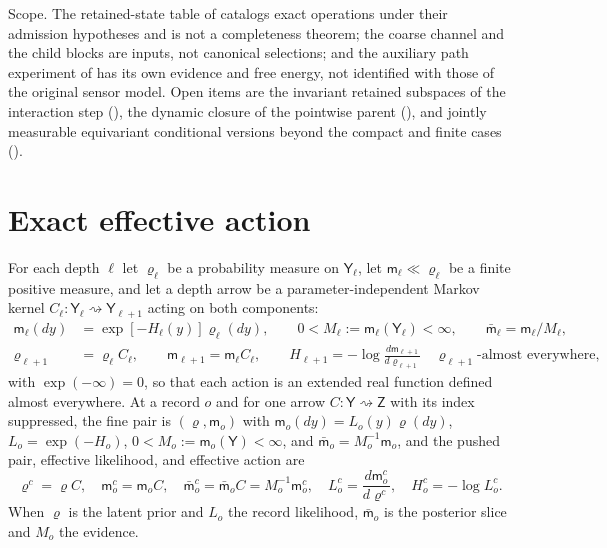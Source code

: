 Scope. The retained-state table of  catalogs exact
operations under their admission hypotheses and is not a completeness theorem;
the coarse channel and the child blocks are inputs, not canonical selections; and
the auxiliary path experiment of  has its own
evidence and free energy, not identified with those of the original sensor model.
 Open items are the invariant retained subspaces of the
interaction step (), the dynamic closure
of the pointwise parent (), and jointly
measurable equivariant conditional versions beyond the compact and finite cases
().

\section{Exact effective action}
\label{sec:rg-effective-action}
\label{sec:rg-measure-pair-arrows}

For each depth $\ell$ let $\varrho_\ell$ be a probability measure on
$\mathsf Y_\ell$, let $\mathsf m_\ell\ll\varrho_\ell$ be a finite positive measure,
and let a depth arrow be a parameter-independent Markov kernel
$C_\ell:\mathsf Y_\ell\rightsquigarrow\mathsf Y_{\ell+1}$ acting on both components:
\begin{align}
\mathsf m_\ell(dy)&=\exp[-H_\ell(y)]\varrho_\ell(dy),
\qquad
0<M_\ell:=\mathsf m_\ell(\mathsf Y_\ell)<\infty,
\qquad
\bar{\mathsf m}_\ell=\mathsf m_\ell/M_\ell,
\label{eq:rg-measure-pair-normalization}\\
\varrho_{\ell+1}&=\varrho_\ell C_\ell,
\qquad
\mathsf m_{\ell+1}=\mathsf m_\ell C_\ell,
\qquad
H_{\ell+1}=-\log\frac{d\mathsf m_{\ell+1}}{d\varrho_{\ell+1}}
\quad\varrho_{\ell+1}\text{-almost everywhere},
\label{eq:rg-measure-pair-action}
\end{align}
with $\exp(-\infty)=0$, so that each action is an extended real function defined
almost everywhere. At a record $o$ and for one arrow
$C:\mathsf Y\rightsquigarrow\mathsf Z$ with its index suppressed, the fine pair is
$(\varrho,\mathsf m_o)$ with $\mathsf m_o(dy)=L_o(y)\varrho(dy)$,
$L_o=\exp(-H_o)$, $0<M_o:=\mathsf m_o(\mathsf Y)<\infty$, and
$\bar{\mathsf m}_o=M_o^{-1}\mathsf m_o$, and the pushed pair, effective likelihood,
and effective action are
\begin{equation}
\varrho^c=\varrho C,
\quad
\mathsf m_o^c=\mathsf m_oC,
\quad
\bar{\mathsf m}_o^c=\bar{\mathsf m}_oC=M_o^{-1}\mathsf m_o^c,
\quad
L_o^c=\frac{d\mathsf m_o^c}{d\varrho^c},
\quad
H_o^c=-\log L_o^c.
\label{eq:rg-reference-evidence-pair}
\end{equation}
When $\varrho$ is the latent prior and $L_o$ the record likelihood,
$\bar{\mathsf m}_o$ is the posterior slice and $M_o$ the evidence.

